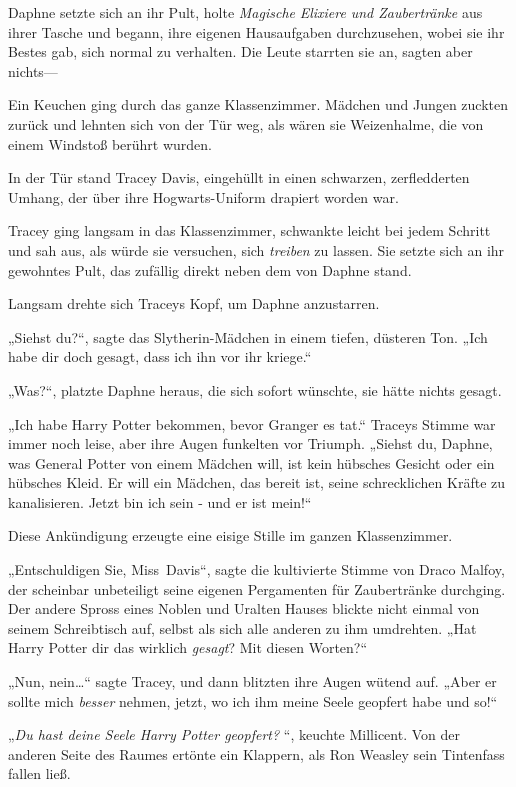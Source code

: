 {Daphne setzte sich an ihr Pult, holte \emph{Magische} \emph{Elixiere} \emph{und Zaubertränke} aus ihrer Tasche und begann, ihre eigenen Hausaufgaben durchzusehen, wobei sie ihr Bestes gab, sich normal zu verhalten. Die Leute starrten sie an, sagten aber nichts—

Ein Keuchen ging durch das ganze Klassenzimmer. Mädchen und Jungen zuckten zurück und lehnten sich von der Tür weg, als wären sie Weizenhalme, die von einem Windstoß berührt wurden.

In der Tür stand Tracey Davis, eingehüllt in einen schwarzen, zerfledderten Umhang, der über ihre Hogwarts-Uniform drapiert worden war.

Tracey ging langsam in das Klassenzimmer, schwankte leicht bei jedem Schritt und sah aus, als würde sie versuchen, sich \emph{treiben} zu lassen. Sie setzte sich an ihr gewohntes Pult, das zufällig direkt neben dem von Daphne stand.

Langsam drehte sich Traceys Kopf, um Daphne anzustarren.

„Siehst du?“, sagte das Slytherin-Mädchen in einem tiefen, düsteren Ton. „Ich habe dir doch gesagt, dass ich ihn vor ihr kriege.“

„Was?“, platzte Daphne heraus, die sich sofort wünschte, sie hätte nichts gesagt.

„Ich habe Harry Potter bekommen, bevor Granger es tat.“ Traceys Stimme war immer noch leise, aber ihre Augen funkelten vor Triumph. „Siehst du, Daphne, was General Potter von einem Mädchen will, ist kein hübsches Gesicht oder ein hübsches Kleid. Er will ein Mädchen, das bereit ist, seine schrecklichen Kräfte zu kanalisieren. Jetzt bin ich sein - und er ist mein!“

Diese Ankündigung erzeugte eine eisige Stille im ganzen Klassenzimmer.

„Entschuldigen Sie, Miss~Davis“, sagte die kultivierte Stimme von Draco Malfoy, der scheinbar unbeteiligt seine eigenen Pergamenten für Zaubertränke durchging. Der andere Spross eines Noblen und Uralten Hauses blickte nicht einmal von seinem Schreibtisch auf, selbst als sich alle anderen zu ihm umdrehten. „Hat Harry Potter dir das wirklich \emph{gesagt}? Mit diesen Worten?“

„Nun, nein…“ sagte Tracey, und dann blitzten ihre Augen wütend auf. „Aber er sollte mich \emph{besser} nehmen, jetzt, wo ich ihm meine Seele geopfert habe und so!“

„\emph{Du hast deine Seele Harry Potter geopfert?} “, keuchte Millicent. Von der anderen Seite des Raumes ertönte ein Klappern, als Ron Weasley sein Tintenfass fallen ließ.

}
